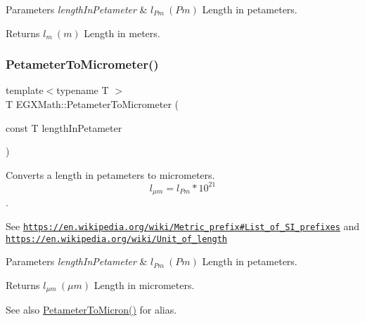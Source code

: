 \begin{DoxyParams}{Parameters}
{\em length\+In\+Petameter} & $ l_{Pm}\ (Pm)$ Length in petameters. \\
\hline
\end{DoxyParams}
\begin{DoxyReturn}{Returns}
$ l_{m}\ (m)$ Length in meters. 
\end{DoxyReturn}
\mbox{\label{group___e_g_x_math-_conversions-_length_conversions-_s_i-_petameter-_s_i_ga3cbe403b66dcb4d5abca922fc48a9a1c}} 
\subsubsection{\texorpdfstring{Petameter\+To\+Micrometer()}{PetameterToMicrometer()}}
{\footnotesize\ttfamily template$<$typename T $>$ \\
T E\+G\+X\+Math\+::\+Petameter\+To\+Micrometer (\begin{DoxyParamCaption}\item[{const T}]{length\+In\+Petameter }\end{DoxyParamCaption})}



Converts a length in petameters to micrometers. \[ l_{\mu m}=l_{Pm} * 10^{21} \]. 

See \href{https://en.wikipedia.org/wiki/Metric_prefix#List_of_SI_prefixes}{\tt https\+://en.\+wikipedia.\+org/wiki/\+Metric\+\_\+prefix\#\+List\+\_\+of\+\_\+\+S\+I\+\_\+prefixes} and \href{https://en.wikipedia.org/wiki/Unit_of_length}{\tt https\+://en.\+wikipedia.\+org/wiki/\+Unit\+\_\+of\+\_\+length} 
\begin{DoxyParams}{Parameters}
{\em length\+In\+Petameter} & $ l_{Pm}\ (Pm)$ Length in petameters. \\
\hline
\end{DoxyParams}
\begin{DoxyReturn}{Returns}
$ l_{\mu m}\ (\mu m)$ Length in micrometers. 
\end{DoxyReturn}
\begin{DoxySeeAlso}{See also}
\mbox{\hyperlink{group___e_g_x_math-_conversions-_length_conversions-_s_i-_petameter-_non-_s_i_gad1c1c26c232339c6304962d20cb29252}{Petameter\+To\+Micron()}} for alias. 
\end{DoxySeeAlso}
\mbox{\label{group___e_g_x_math-_conversions-_length_conversions-_s_i-_petameter-_s_i_ga932654bf571e2dd9aa912a34fbcfe49f}} 
